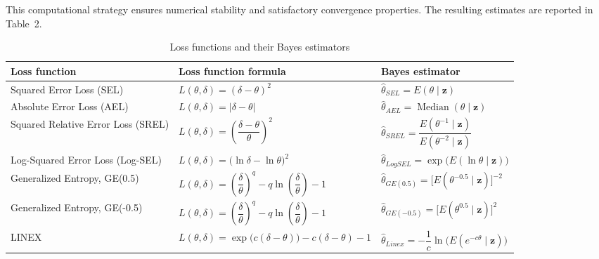\documentclass[twoside]{article}
\begin{document}
This computational strategy ensures numerical stability and satisfactory convergence properties. The resulting estimates are reported in Table~2.
\begin{table}[H]
\centering
\caption{Loss functions and their Bayes estimators}
\label{tab:loss_estimators}
\setlength{\tabcolsep}{4pt}
\renewcommand{\arraystretch}{1.3}

\small
\begin{tabularx}{\textwidth}{@{}p{3.8cm}p{5.2cm}X@{}}
\toprule
Loss function & Loss function formula & Bayes estimator \\
\midrule

Squared Error Loss (SEL) 
& $L(\theta,\delta)=(\delta-\theta)^2$ 
& $\hat{\theta}_{SEL}=E(\theta\mid\mathbf{z})$ \\

Absolute Error Loss (AEL) 
& $L(\theta,\delta)=|\delta-\theta|$ 
& $\hat{\theta}_{AEL}=\operatorname{Median}(\theta\mid\mathbf{z})$ \\

Squared Relative Error Loss (SREL) 
& $L(\theta,\delta)=\left(\dfrac{\delta-\theta}{\theta}\right)^2$ 
& $\hat{\theta}_{SREL}=\dfrac{E(\theta^{-1}\mid\mathbf{z})}{E(\theta^{-2}\mid\mathbf{z})}$ \\

Log-Squared Error Loss (Log-SEL) 
& $L(\theta,\delta)=\big(\ln\delta-\ln\theta\big)^2$ 
& $\hat{\theta}_{LogSEL}=\exp\!\big(E(\ln\theta\mid\mathbf{z})\big)$ \\

Generalized Entropy, GE(0.5) 
& $L(\theta,\delta)=\left(\dfrac{\delta}{\theta}\right)^q-\!q\ln\!\left(\dfrac{\delta}{\theta}\right)-1$ 
& $\hat{\theta}_{GE(0.5)}=\big[E(\theta^{-0.5}\mid\mathbf{z})\big]^{-2}$ \\

Generalized Entropy, GE(-0.5) 
& $L(\theta,\delta)=\left(\dfrac{\delta}{\theta}\right)^q-\!q\ln\!\left(\dfrac{\delta}{\theta}\right)-1$ 
& $\hat{\theta}_{GE(-0.5)}=\big[E(\theta^{0.5}\mid\mathbf{z})\big]^{2}$ \\

LINEX  
& $L(\theta,\delta)=\exp\!\big(c(\delta-\theta)\big)-c(\delta-\theta)-1$ 
& $\hat{\theta}_{Linex}=-\dfrac{1}{c}\ln\!\big(E(e^{-c\theta}\mid\mathbf{z})\big)$ \\


\bottomrule
\end{tabularx}
\end{table}
\end{document}

